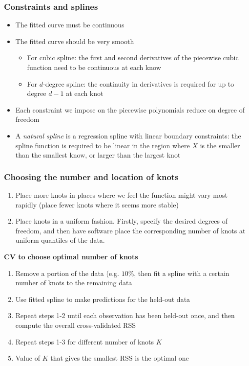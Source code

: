 \documentclass[11pt]{article}
\begin{document}
\subsubsection{Constraints and splines}
\begin{itemize}
    \item The fitted curve must be continuous
    \item The fitted curve should be very smooth
        \begin{itemize}
            \item For cubic spline: the first and second derivatives of the piecewise cubic function need to be continuous at each know
            \item For $d$-degree spline: the continuity in derivatives is required for up to degree $d-1$ at each knot
        \end{itemize}
    \item Each constraint we impose on the piecewise polynomials reduce on degree of freedom
    \item A \textit{natural spline} is a regression spline with linear boundary constraints: the spline function is required to be linear in the region where $X$ is the smaller than the smallest know, or larger than the largest knot
\end{itemize}

\subsubsection{Choosing the number and location of knots}
\begin{enumerate}
    \item Place more knots in places where we feel the function might vary most rapidly (place fewer knots where it seems more stable)
    \item Place knots in a uniform fashion. Firstly, specify the desired degrees of freedom, and then have software place the corresponding number of knots at uniform quantiles of the data.
\end{enumerate} \phantom{i}

\noindent \textbf{CV to choose optimal number of knots}
\begin{enumerate}
    \item Remove a portion of the data (e.g. $10\%$, then fit a spline with a certain number of knots to the remaining data
    \item Use fitted spline to make predictions for the held-out data
    \item Repeat steps 1-2 until each observation has been held-out once, and then compute the overall cross-validated RSS
    \item Repeat steps 1-3 for different number of knots $K$
    \item Value of $K$ that gives the smallest RSS is the optimal one
\end{enumerate} \phantom{i}
\end{document}
